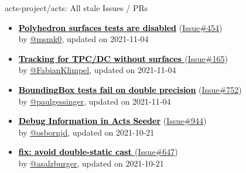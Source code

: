 \begin{frame}[allowframebreaks]{ acts-project/acts: All stale Issues / PRs}
\begin{itemize}
    \item
    \textbf{\href{https://github.com/acts-project/acts/issues/454}{\textcolor{black}{Polyhedron surfaces tests are disabled}}}
    (\href{https://github.com/acts-project/acts/issues/454}{Issue\#454}) \\
    by \href{https://github.com/msmk0}{ @msmk0}, updated on 2021-11-04

    \item
    \textbf{\href{https://github.com/acts-project/acts/issues/165}{\textcolor{black}{Tracking for TPC/DC without surfaces }}}
    (\href{https://github.com/acts-project/acts/issues/165}{Issue\#165}) \\
    by \href{https://github.com/FabianKlimpel}{ @FabianKlimpel}, updated on 2021-11-04

    \item
    \textbf{\href{https://github.com/acts-project/acts/issues/752}{\textcolor{black}{BoundingBox tests fail on double precision}}}
    (\href{https://github.com/acts-project/acts/issues/752}{Issue\#752}) \\
    by \href{https://github.com/paulgessinger}{ @paulgessinger}, updated on 2021-11-04

    \item
    \textbf{\href{https://github.com/acts-project/acts/issues/944}{\textcolor{black}{Debug Information in Acts Seeder}}}
    (\href{https://github.com/acts-project/acts/issues/944}{Issue\#944}) \\
    by \href{https://github.com/osbornjd}{ @osbornjd}, updated on 2021-10-21

    \item
    \textbf{\href{https://github.com/acts-project/acts/issues/647}{\textcolor{black}{fix: avoid double-static cast }}}
    (\href{https://github.com/acts-project/acts/issues/647}{Issue\#647}) \\
    by \href{https://github.com/asalzburger}{ @asalzburger}, updated on 2021-10-21

  \end{itemize}
\end{frame}





